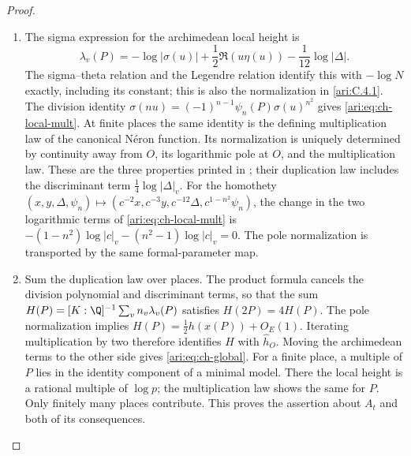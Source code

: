 \begin{proof}
\begin{enumerate}[label=\arabic*.,leftmargin=*]
\item The sigma expression for the archimedean local height is
\[
 \lambda_v(P)=-\log|\sigma(u)|
       +\frac12\Re(u\eta(u))-\frac1{12}\log|\Delta|.
\]
The sigma--theta relation and the Legendre relation identify this
with $-\log N$ exactly, including its constant; this is also the
normalization in \cref{ari:C.4.1}. The division identity
$\sigma(nu)=(-1)^{n-1}\psi_n(P)\sigma(u)^{n^2}$ gives
\eqref{ari:eq:ch-local-mult}. At finite places the same identity is
the defining multiplication law of the canonical N\'eron function.
Its normalization is uniquely determined by continuity away from
$O$, its logarithmic pole at $O$, and the multiplication law.
These are the three properties printed in
\citet[Section~2.1, arXiv v2, pp.~5--6]{demarco2017}; their duplication law includes
the discriminant term $\frac14\log|\Delta|_v$.
For the homothety
$(x,y,\Delta,\psi_n)\mapsto
(c^{-2}x,c^{-3}y,c^{-12}\Delta,c^{1-n^2}\psi_n)$,
the change in the two logarithmic terms of
\eqref{ari:eq:ch-local-mult} is
$-(1-n^2)\log|c|_v-(n^2-1)\log|c|_v=0$.
The pole normalization is transported by the same formal-parameter map.

\item Sum the duplication law over places. The product formula cancels
the division polynomial and discriminant terms, so that the sum
$H(P)=[K:\Q]^{-1}\sum_vn_v\lambda_v(P)$ satisfies
$H(2P)=4H(P)$. The pole normalization implies
$H(P)=\frac12h(x(P))+O_E(1)$. Iterating multiplication by two
therefore identifies $H$ with $\widehat h_O$. Moving the
archimedean terms to the other side gives \eqref{ari:eq:ch-global}.
For a finite place, a multiple of $P$ lies in the identity component
of a minimal model. There the local height is a rational multiple
of $\log p$; the multiplication law shows the same for $P$.
Only finitely many places contribute. This proves the assertion
about $A_t$ and both of its consequences.
\end{enumerate}
\end{proof}